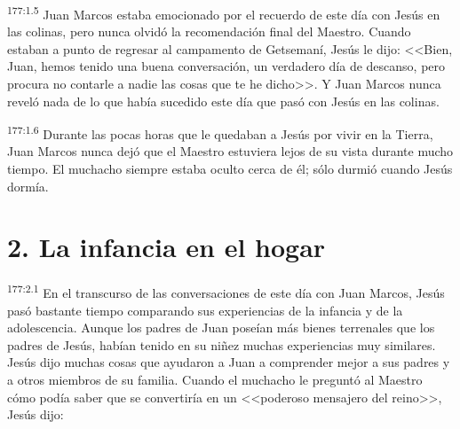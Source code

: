 \par 
\textsuperscript{177:1.5} Juan Marcos estaba emocionado por el recuerdo de este día con Jesús en las colinas, pero nunca olvidó la recomendación final del Maestro. Cuando estaban a punto de regresar al campamento de Getsemaní, Jesús le dijo: <<Bien, Juan, hemos tenido una buena conversación, un verdadero día de descanso, pero procura no contarle a nadie las cosas que te he dicho>>. Y Juan Marcos nunca reveló nada de lo que había sucedido este día que pasó con Jesús en las colinas.

\par 
\textsuperscript{177:1.6} Durante las pocas horas que le quedaban a Jesús por vivir en la Tierra, Juan Marcos nunca dejó que el Maestro estuviera lejos de su vista durante mucho tiempo. El muchacho siempre estaba oculto cerca de él; sólo durmió cuando Jesús dormía.

\section*{2. La infancia en el hogar}
\par 
\textsuperscript{177:2.1} En el transcurso de las conversaciones de este día con Juan Marcos, Jesús pasó bastante tiempo comparando sus experiencias de la infancia y de la adolescencia. Aunque los padres de Juan poseían más bienes terrenales que los padres de Jesús, habían tenido en su niñez muchas experiencias muy similares. Jesús dijo muchas cosas que ayudaron a Juan a comprender mejor a sus padres y a otros miembros de su familia. Cuando el muchacho le preguntó al Maestro cómo podía saber que se convertiría en un <<poderoso mensajero del reino>>, Jesús dijo:

